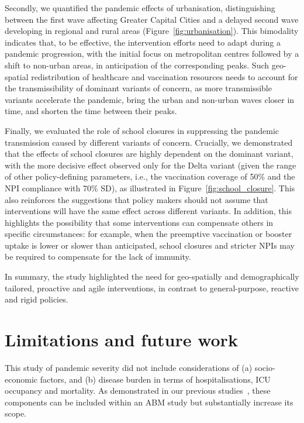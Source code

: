 \documentclass{article}
\begin{document}
Secondly, we quantified the pandemic effects of urbanisation, distinguishing between the first wave affecting  Greater Capital Cities and a delayed second wave developing in regional and rural areas (Figure~\ref{fig:urbanisation}). This bimodality indicates that, to be effective, the intervention efforts need to adapt during a pandemic progression, with the initial focus on metropolitan centres followed by a shift to non-urban areas, in anticipation of the corresponding peaks. Such geo-spatial redistribution of healthcare and vaccination resources needs to account for the transmissibility of  dominant variants of concern, as more transmissible variants accelerate the pandemic, bring the urban and non-urban waves closer in time, and shorten the time between their peaks. 

Finally, we evaluated the role of school closures in suppressing the pandemic transmission caused by different variants of concern. Crucially, we demonstrated that the effects of school closures are highly dependent on the dominant variant, with the more decisive effect observed only for the Delta variant (given the range of other policy-defining parameters, i.e., the vaccination coverage of 50\% and the NPI compliance with 70\% SD), as illustrated in Figure~\ref{fig:school_closure}. This also reinforces the suggestions that policy makers should not assume that interventions will have the same effect across different variants. In addition, this highlights the possibility that some interventions can compensate others in specific circumstances: for example, when the preemptive vaccination or booster uptake is lower or slower than anticipated, school closures and stricter NPIs may be required to compensate for the lack of immunity. 

In summary, the study highlighted the need for geo-spatially and demographically tailored, proactive and agile interventions, in contrast to general-purpose, reactive and rigid policies.

\section{Limitations and future work}

This study of pandemic severity did not include considerations of
(a) socio-economic factors, and (b) disease burden in terms of hospitalisations, ICU occupancy and mortality. As demonstrated in our previous studies~\cite{nguyen_general_2022,chang_simulating_2022,chang_persistence_2023}, these components can be included within an ABM study but substantially increase its scope.  
\end{document}
